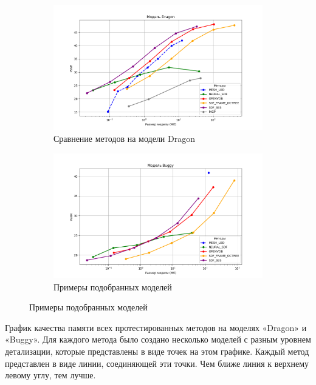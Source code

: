 \documentclass[a4paper,hidelinks,12pt]{article}
\begin{document}
\begin{figure}[htp]
	\centering

	\begin{subfigure}{0.8\linewidth}
			\includegraphics[width=\linewidth]{dragon_psnr.png}
			\caption{Сравнение методов на модели Dragon}
	\end{subfigure}
	
	\vfill %
	
	\begin{subfigure}{0.8\linewidth}
			\includegraphics[width=\linewidth]{buggy_psnr.png}
			\caption{Примеры подобранных моделей}
	\end{subfigure}
\end{figure}

График качества памяти всех протестированных методов на моделях «Dragon» и «Buggy». Для каждого метода было создано несколько моделей с разным уровнем детализации, которые представлены в виде точек на этом графике. Каждый метод представлен в виде линии, соединяющей эти точки. Чем ближе линия к верхнему левому углу,
тем лучше.
\end{document}
